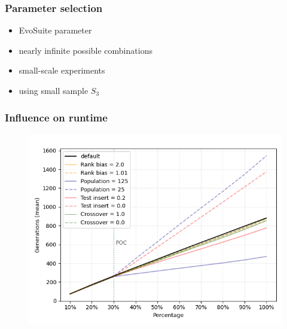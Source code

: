 \begin{frame}
	\frametitle{Parameter selection}
	
	\begin{itemize}
		\item EvoSuite parameter
		\item nearly infinite possible combinations
		\item small-scale experiments
		\item using small sample $S_3$
	\end{itemize}
	
\end{frame}

\begin{frame}
	\frametitle{Influence on runtime}
	\begin{figure}
		\includegraphics[height=0.9\textheight]{figures/generations_parameter}
	\end{figure}	
\end{frame}

